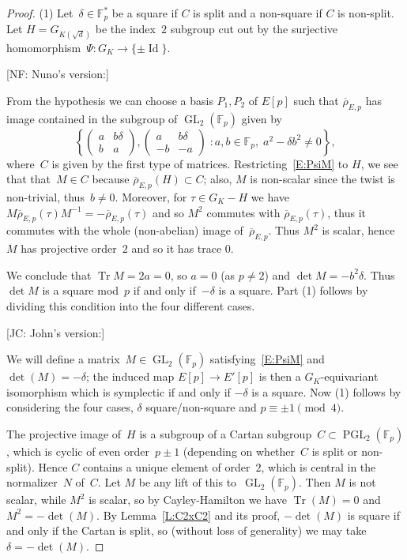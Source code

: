 \documentclass[12pt, reqno]{amsart}
\newcommand{\F}{\mathbb{F}}
\newcommand{\rhobar}{{\overline{\rho}}}
\DeclareMathOperator{\Tr}{Tr}
\newcommand{\GL}{\operatorname{GL}}
\newcommand{\PGL}{\operatorname{PGL}}
\DeclareMathOperator{\Id}{Id}
\numberwithin{equation}{section}
\theoremstyle{definition}
\theoremstyle{remark}
\newcommand{\nf}[1]{{\color{blue} \textsf{[NF: #1]}}}
\newcommand{\jc}[1]{{\color{darkgreen} \textsf{[JC: #1]}}}
\begin{document}
\begin{proof} (1)
Let~$\delta \in \F_p^*$ be a square if $C$ is split and a non-square
if $C$ is non-split.  Let $H=G_{K(\sqrt{d})}$ be the index~$2$
subgroup cut out by the surjective homomorphism~$\Psi:G_K\to\{\pm \Id \}$.

\nf{Nuno's version:}

From the hypothesis we can 
choose a basis $P_1, P_2$ of $E[p]$ such that 
$\rhobar_{E,p}$ has image 
contained in the subgroup of $\GL_2(\F_p)$ given by 
\[
\left\{ 
\begin{pmatrix}
a & b\delta \\
b & a
\end{pmatrix}, 
\begin{pmatrix}
a & b\delta \\
-b & -a
\end{pmatrix}  \; : a, b \in \F_p, \; a^2 - \delta b^2 \neq 0 \right\},
\]
where~$C$ is given by the first type of matrices. 
Restricting~\eqref{E:PsiM} to $H$, we see that 
that~$M \in C$ because $\rhobar_{E,p}(H) \subset C$; also, $M$ 
is non-scalar since the twist is non-trivial,
thus~$b \neq 0$. 
Moreover, for $\tau \in G_K - H$ we have 
$M \rhobar_{E,p}(\tau) M^{-1} =-\rhobar_{E,p}(\tau)$ and so $M^2$ commutes with 
$\rhobar_{E,p}(\tau)$, thus it commutes with the whole (non-abelian) image 
of~$\rhobar_{E,p}$. Thus $M^2$ is scalar, hence 
$M$ has projective order~$2$ and so it has trace 0.

We conclude that $\Tr M = 2a = 0$, so $a=0$ (as $p \neq 2$) and $\det
M = -b^2\delta$. Thus $\det M$ is a square mod~$p$ if and only
if~$-\delta$ is a square. Part (1) follows by dividing this condition
into the four different cases.

\jc{John's version:}

We will define a matrix~$M\in\GL_2(\F_p)$ satisfying~\eqref{E:PsiM}
and $\det(M)=-\delta$; the induced map $E[p]\to E'[p]$ is then a
$G_K$-equivariant isomorphism which is symplectic if and only if
$-\delta$ is a square.  Now (1) follows by considering the four cases,
$\delta$ square/non-square and $p\equiv\pm1\pmod4$.

The projective image of~$H$ is a subgroup of a Cartan
subgroup~$C\subset\PGL_2(\F_p)$, which is cyclic of even order~$p\pm1$
(depending on whether~$C$ is split or non-split).  Hence $C$ contains
a unique element of order~$2$, which is central in the normalizer~$N$
of~$C$.  Let $M$ be any lift of this to~$\GL_2(\F_p)$.  Then $M$ is
not scalar, while $M^2$ is scalar, so by Cayley-Hamilton we have
$\Tr(M)=0$ and $M^2=-\det(M)$.  By Lemma~\ref{L:C2xC2} and its proof,
$-\det(M)$ is square if and only if the Cartan is split, so (without
loss of generality) we may take $\delta=-\det(M)$.


\end{proof}
\end{document}
